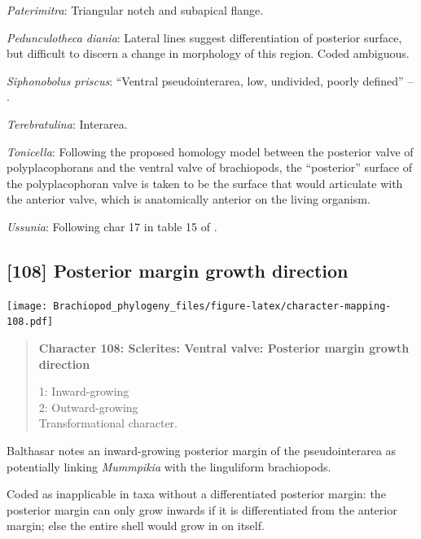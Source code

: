 \documentclass[openany]{book}
\begin{document}
\hypertarget{Paterimitra-coding-107}{}
\emph{Paterimitra}: Triangular notch and subapical flange.

\hypertarget{Pedunculotheca_diania-coding-107}{}
\emph{Pedunculotheca diania}: Lateral lines suggest differentiation of
posterior surface, but difficult to discern a change in morphology of
this region. Coded ambiguous.

\hypertarget{Siphonobolus_priscus-coding-107}{}
\emph{Siphonobolus priscus}: ``Ventral pseudointerarea, low, undivided,
poorly defined'' -- \citet{Williams2000LinguliformeaCraniiformea}.

\hypertarget{Terebratulina-coding-107}{}
\emph{Terebratulina}: Interarea.

\hypertarget{Tonicella-coding-107}{}
\emph{Tonicella}: Following the proposed homology model between the
posterior valve of polyplacophorans and the ventral valve of
brachiopods, the ``posterior'' surface of the polyplacophoran valve is
taken to be the surface that would articulate with the anterior valve,
which is anatomically anterior on the living organism.

\hypertarget{Ussunia-coding-107}{}
\emph{Ussunia}: Following char 17 in table 15 of
\citet{Williams2000LinguliformeaCraniiformea}.

\subsection*{{[}108{]} Posterior margin growth
direction}\label{posterior-margin-growth-direction}

\texttt{[image: Brachiopod\_phylogeny\_files/figure-latex/character-mapping-108.pdf]}

\begin{quote}
\textbf{Character 108: Sclerites: Ventral valve: Posterior margin growth
direction}

1: Inward-growing\\
2: Outward-growing\\
Transformational character.
\end{quote}

Balthasar \citeyearpar{Balthasar2008iMummpikia} notes an inward-growing
posterior margin of the pseudointerarea as potentially linking
\emph{Mummpikia} with the linguliform brachiopods.

Coded as inapplicable in taxa without a differentiated posterior margin:
the posterior margin can only grow inwards if it is differentiated from
the anterior margin; else the entire shell would grow in on itself.
\end{document}
